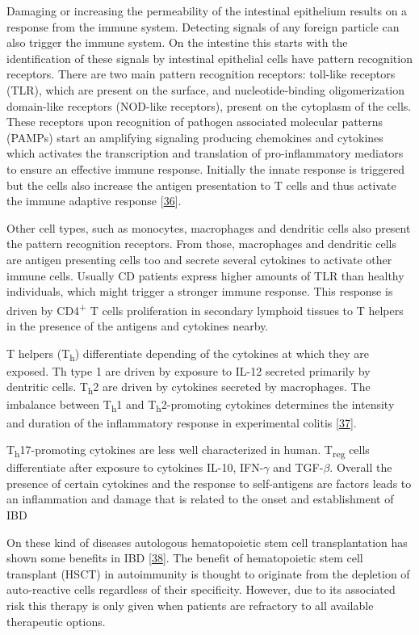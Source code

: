 \documentclass[
  12pt,
  a4paper,
  twoside,
  openright]{book}
\begin{document}
Damaging or increasing the permeability of the intestinal epithelium results on a response from the immune system.
Detecting signals of any foreign particle can also trigger the immune system.
On the intestine this starts with the identification of these signals by intestinal epithelial cells have pattern recognition receptors.
There are two main pattern recognition receptors: toll-like receptors (TLR), which are present on the surface, and nucleotide-binding oligomerization domain-like receptors (NOD-like receptors), present on the cytoplasm of the cells.
These receptors upon recognition of pathogen associated molecular patterns (PAMPs) start an amplifying signaling producing chemokines and cytokines which activates the transcription and translation of pro-inflammatory mediators to ensure an effective immune response.
Initially the innate response is triggered but the cells also increase the antigen presentation to T cells and thus activate the immune adaptive response {[}\protect\hyperlink{ref-mayorgas2021a}{36}{]}.

Other cell types, such as monocytes, macrophages and dendritic cells also present the pattern recognition receptors.
From those, macrophages and dendritic cells are antigen presenting cells too and secrete several cytokines to activate other immune cells.
Usually CD patients express higher amounts of TLR than healthy individuals, which might trigger a stronger immune response.
This response is driven by CD4\textsuperscript{+} T cells proliferation in secondary lymphoid tissues to T helpers in the presence of the antigens and cytokines nearby.

T helpers (T\textsubscript{h}) differentiate depending of the cytokines at which they are exposed.
Th type 1 are driven by exposure to IL-12 secreted primarily by dentritic cells.
T\textsubscript{h}2 are driven by cytokines secreted by macrophages.
The imbalance between T\textsubscript{h}1 and T\textsubscript{h}2-promoting cytokines determines the intensity and duration of the inflammatory response in experimental colitis {[}\protect\hyperlink{ref-neurath1996}{37}{]}.

T\textsubscript{h}17-promoting cytokines are less well characterized in human.
T\textsubscript{reg} cells differentiate after exposure to cytokines IL-10, IFN-\(\gamma\) and TGF-\(\beta\).
Overall the presence of certain cytokines and the response to self-antigens are factors leads to an inflammation and damage that is related to the onset and establishment of IBD

On these kind of diseases autologous hematopoietic stem cell transplantation has shown some benefits in IBD {[}\protect\hyperlink{ref-corraliza}{38}{]}.
The benefit of hematopoietic stem cell transplant (HSCT) in autoimmunity is thought to originate from the depletion of auto-reactive cells regardless of their specificity.
However, due to its associated risk this therapy is only given when patients are refractory to all available therapeutic options.
\end{document}

